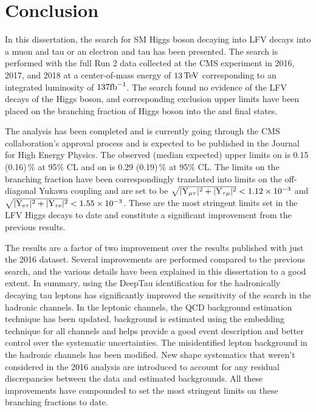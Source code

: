 %
%

\chapter{Conclusion}
\label{conclusion}

In this dissertation, the search for SM Higgs boson decaying into LFV decays into a muon and tau or an electron and tau has been presented. The search is performed with the full Run 2 data collected at the CMS experiment in 2016, 2017, and 2018 at a center-of-mass energy of $13 \,\text{Te\hspace{-.08em}V}$ corresponding to an integrated luminosity of $137 \text{fb}^{-1}$. The search found no evidence of the LFV decays of the Higgs boson, and corresponding exclusion upper limits have been placed on the branching fraction of Higgs boson into the \mutau and \etau final states.

The analysis has been completed and is currently going through the CMS collaboration's approval process and is expected to be published in the Journal for High Energy Physics. The observed (median expected) upper limits on \BHmt is 0.15 (0.16)\,\% at 95\% CL and on \BHet is 0.29 (0.19)\,\% at 95\% CL. The limits on the branching fraction have been correspondingly translated into limits on the off-diagonal Yukawa coupling and are set to be $\sqrt{|\text{Y}_{\mu\tau}|^{2}+|\text{Y}_{\tau\mu}|^{2}} < 1.12 \times 10^{-3}$ and $\sqrt{|\text{Y}_{\text{e}\tau}|^{2}+|\text{Y}_{\tau\text{e}}|^{2}} < 1.55 \times 10^{-3}$. These are the most stringent limits set in the LFV Higgs decays to date and constitute a significant improvement from the previous results.

The results are a factor of two improvement over the results published with just the 2016 dataset. Several improvements are performed compared to the previous search, and the various details have been explained in this dissertation to a good extent. In summary, using the DeepTau identification for the hadronically decaying tau leptons has significantly improved the sensitivity of the search in the hadronic channels. In the leptonic channels, the QCD background estimation technique has been updated. \Ztt background is estimated using the embedding technique for all channels and helps provide a good event description and better control over the systematic uncertainties. The misidentified lepton background in the hadronic channels has been modified. New shape systematics that weren't considered in the 2016 analysis are introduced to account for any residual discrepancies between the data and estimated backgrounds. All these improvements have compounded to set the most stringent limits on these branching fractions to date.

